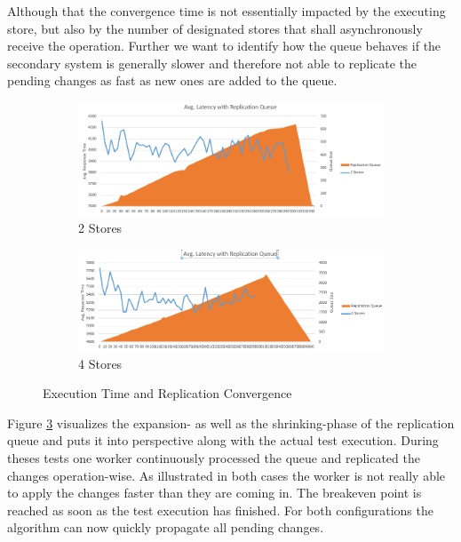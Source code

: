 Although that the convergence time is not essentially impacted by the executing store, but also by the number of designated stores that shall asynchronously 
receive the operation. 
Further we want to identify how the queue behaves if the secondary system is generally slower and therefore not able to replicate 
the pending changes as fast as new ones are added to the queue.


\begin{figure}[t]
    \centering
    \begin{subfigure}{.5\textwidth}
      \centering
      \includegraphics[width=.9\linewidth]{Figures/2latency_queue.PNG}
      \caption{2 Stores}
      \label{fig:converge_2}
    \end{subfigure}%
    \begin{subfigure}{.5\textwidth}
      \centering
      \includegraphics[width=.9\linewidth]{Figures/4latence_queue.PNG}
      \caption{4 Stores}
      \label{fig:converge_4}
    \end{subfigure}
    \caption{Execution Time and Replication Convergence}
    \label{fig:converge_24}
\end{figure}


Figure \ref{fig:converge_24} visualizes the expansion- as well as the shrinking-phase of the replication queue
and puts it into perspective along with the actual test execution. During theses tests one worker continuously processed the queue and replicated 
the changes operation-wise. As illustrated in both cases the worker is not really able to apply the changes faster than they are coming in.
The breakeven point is reached as soon as the test execution has finished. For both configurations the algorithm can now quickly propagate all pending
changes.\\

